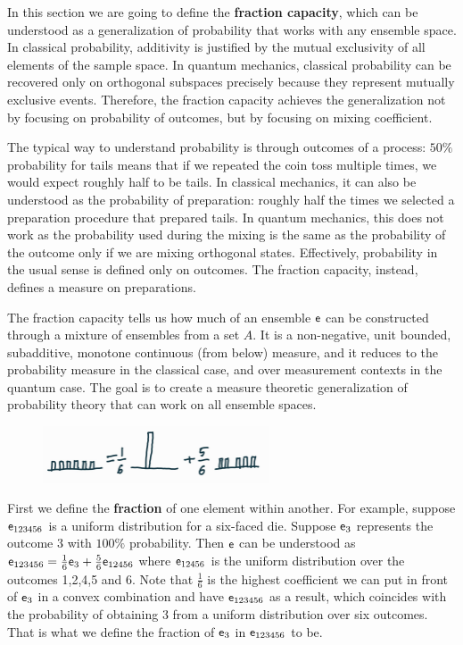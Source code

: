 In this section we are going to define the \textbf{fraction capacity}, which can be understood as a generalization of probability that works with any ensemble space. In classical probability, additivity is justified by the mutual exclusivity of all elements of the sample space. In quantum mechanics, classical probability can be recovered only on orthogonal subspaces precisely because they represent mutually exclusive events. Therefore, the fraction capacity achieves the generalization not by focusing on probability of outcomes, but by focusing on mixing coefficient.


The typical way to understand probability is through outcomes of a process: $50\%$ probability for tails means that if we repeated the coin toss multiple times, we would expect roughly half to be tails. In classical mechanics, it can also be understood as the probability of preparation: roughly half the times we selected a preparation procedure that prepared tails. In quantum mechanics, this does not work as the probability used during the mixing is the same as the probability of the outcome only if we are mixing orthogonal states. Effectively, probability in the usual sense is defined only on outcomes. The fraction capacity, instead, defines a measure on preparations.

The fraction capacity tells us how much of an ensemble $\mathsf{e}$ can be constructed through a mixture of ensembles from a set $A$. It is a non-negative, unit bounded, subadditive, monotone continuous (from below) measure, and it reduces to the probability measure in the classical case, and over measurement contexts in the quantum case. The goal is to create a measure theoretic generalization of probability theory that can work on all ensemble spaces.

\begin{figure}[h]
	\centering
	\includegraphics[width=0.6\textwidth]{tempimages/Fraction.jpg}
\end{figure}

First we define the \textbf{fraction} of one element within another. For example, suppose $\mathsf{e}_{123456}$ is a uniform distribution for a six-faced die. Suppose $\mathsf{e}_3$ represents the outcome 3 with $100\%$ probability. Then $\mathsf{e}$ can be understood as $\mathsf{e}_{123456} = \frac{1}{6} \mathsf{e}_3 + \frac{5}{6} \mathsf{e}_{12456}$ where $\mathsf{e}_{12456}$ is the uniform distribution over the outcomes 1,2,4,5 and 6. Note that $\frac{1}{6}$ is the highest coefficient we can put in front of $\mathsf{e}_3$ in a convex combination and have $\mathsf{e}_{123456}$ as a result, which coincides with the probability of obtaining 3 from a uniform distribution over six outcomes. That is what we define the fraction of $\mathsf{e}_3$ in $\mathsf{e}_{123456}$ to be.

